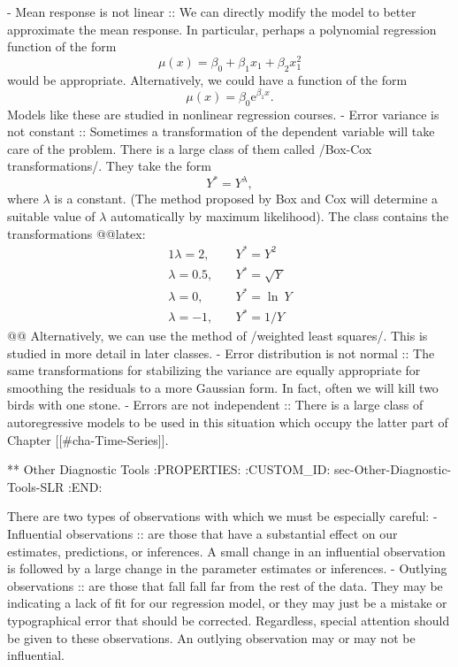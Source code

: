 - Mean response is not linear :: We can directly modify the model to
     better approximate the mean response. In particular, perhaps a
     polynomial regression function of the form \[ \mu(x) =
     \beta_{0} + \beta_{1}x_{1} + \beta_{2}x_{1}^{2} \] would be
     appropriate. Alternatively, we could have a function of the form
     \[ \mu(x)=\beta_{0}\mathrm{e}^{\beta_{1}x}.  \] Models like these
     are studied in nonlinear regression courses.
- Error variance is not constant :: Sometimes a transformation of the
     dependent variable will take care of the problem. There is a
     large class of them called /Box-Cox transformations/. They take
     the form
     \begin{equation}
     Y^{\ast}=Y^{\lambda},
     \end{equation}
     where \(\lambda\) is a constant. (The method proposed by Box and
     Cox will determine a suitable value of \(\lambda\) automatically
     by maximum likelihood). The class contains the transformations
     @@latex:\begin{alignat*}{1} \lambda=2,\quad &
     Y^{\ast}=Y^{2}\\ \lambda=0.5,\quad &
     Y^{\ast}=\sqrt{Y}\\ \lambda=0,\quad & Y^{\ast}=\ln\:
     Y\\ \lambda=-1,\quad & Y^{\ast}= 1/Y \end{alignat*}@@
     Alternatively, we can use the method of /weighted least
     squares/. This is studied in more detail in later classes.
- Error distribution is not normal :: The same transformations for
     stabilizing the variance are equally appropriate for smoothing
     the residuals to a more Gaussian form. In fact, often we will
     kill two birds with one stone.
- Errors are not independent :: There is a large class of
     autoregressive models to be used in this situation which occupy
     the latter part of Chapter [[#cha-Time-Series]].

** Other Diagnostic Tools
:PROPERTIES:
:CUSTOM_ID: sec-Other-Diagnostic-Tools-SLR
:END:

There are two types of observations with which we must be especially
careful:
- Influential observations :: are those that have a substantial effect
     on our estimates, predictions, or inferences. A small change in
     an influential observation is followed by a large change in the
     parameter estimates or inferences.
- Outlying observations :: are those that fall fall far from the rest
     of the data. They may be indicating a lack of fit for our
     regression model, or they may just be a mistake or typographical
     error that should be corrected. Regardless, special attention
     should be given to these observations. An outlying observation
     may or may not be influential.

